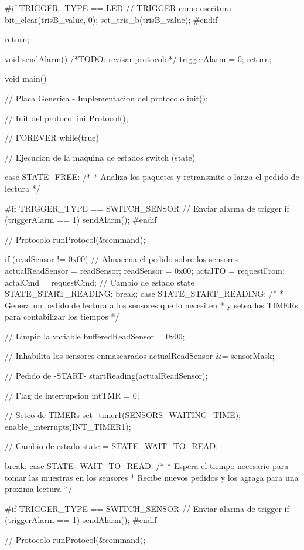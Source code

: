 {\begin{verbatimtab}
{#if TRIGGER_TYPE == LED
	// TRIGGER como escritura
	bit_clear(trisB_value, 0);
	set_tris_b(trisB_value);
#endif

	return;	
}	

void sendAlarm()
{
	/*TODO: revisar protocolo*/	
	triggerAlarm = 0;
	return;
}	

void main()
{
	// Placa Generica - Implementacion del protocolo
	init();

	// Init del protocol
	initProtocol();

	// FOREVER
	while(true)
	{

		// Ejecucion de la maquina de estados
		switch (state)
		{
			case STATE_FREE:
				/*
				* Analiza los paquetes y retransmite o lanza el pedido de lectura
				*/
				
#if TRIGGER_TYPE == SWITCH_SENSOR
				// Enviar alarma de trigger
				if (triggerAlarm == 1)
					sendAlarm();
#endif

				// Protocolo
				runProtocol(&command);

				if (readSensor != 0x00)
				{
					// Almacena el pedido sobre los sensores
					actualReadSensor = readSensor;
					readSensor = 0x00;
					actalTO = requestFrom;
					actalCmd = requestCmd;
					// Cambio de estado
					state = STATE_START_READING;
				}	
				break;
			case STATE_START_READING:
				/*
				* Genera un pedido de lectura a los sensores que lo necesiten
				* y setea los TIMERs para contabilizar los tiempos
				*/
				
				// Limpio la variable
				bufferedReadSensor = 0x00;

				// Inhabilita los sensores enmascarados
				actualReadSensor &= sensorMask;
				
				// Pedido de -START-
				startReading(actualReadSensor);
				
				// Flag de interrupcion
				intTMR = 0;
				
				// Seteo de TIMERs
				set_timer1(SENSORS_WAITING_TIME);
				enable_interrupts(INT_TIMER1);
				
				// Cambio de estado
				state = STATE_WAIT_TO_READ;
				
				break;
			case STATE_WAIT_TO_READ:
				/*
				* Espera el tiempo necesario para tomar las muestras en los sensores
				* Recibe nuevos pedidos y los agraga para una proxima lectura
				*/

#if TRIGGER_TYPE == SWITCH_SENSOR
				// Enviar alarma de trigger
				if (triggerAlarm == 1)
					sendAlarm();
#endif

				// Protocolo
				runProtocol(&command);
				
}}}
\end{verbatimtab}}
